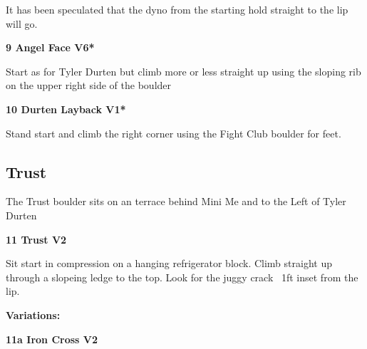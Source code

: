 \begin{multicols}{2}
\begin{adjustwidth}{0.5cm}{}
\begin{minipage}{\linewidth}
							\begin{adjustwidth}{0.5cm}{}				
							It has been speculated that the dyno from the starting hold straight to the lip will go.
							\end{adjustwidth}
							\end{minipage}
						\end{adjustwidth}
					\begin{minipage}{\linewidth}	
					\label{rt:Angel Face}
\colorbox{RoyalBlue!20}{
\parbox{0.95\textwidth}{
\textbf{
9 Angel Face V6*  
}
}
}

					\begin{adjustwidth}{0.5cm}{}				
					Start as for Tyler Durten but climb more or less straight up using the sloping rib on the upper right side of the boulder
					\end{adjustwidth}
					\end{minipage}
					\begin{minipage}{\linewidth}	
					\label{rt:Durten Layback}
\colorbox{green!20}{
\parbox{0.95\textwidth}{
\textbf{
10 Durten Layback V1*  
}
}
}

					\begin{adjustwidth}{0.5cm}{}				
					Stand start and climb the right corner using the Fight Club boulder for feet.
					\end{adjustwidth}
					\end{minipage}
			\begin{minipage}{\columnwidth}
			\subsection*{Trust}\label{bf:Trust}
			The Trust boulder sits on an terrace behind Mini Me and to the Left of Tyler Durten
			
			\end{minipage}
			

					\begin{minipage}{\linewidth}	
					\label{rt:Trust}
\colorbox{green!20}{
\parbox{0.95\textwidth}{
\textbf{
11 Trust V2     
}
}
}

					\begin{adjustwidth}{0.5cm}{}				
					Sit start in compression on a hanging refrigerator block. Climb straight up through a slopeing ledge to the top. Look for the juggy crack ~1ft inset from the lip.
					\end{adjustwidth}
					\end{minipage}
						\begin{adjustwidth}{0.5cm}{}				
						\textbf{Variations:} \newline
							\begin{minipage}{\linewidth}	
							\label{vr:Iron Cross}
\colorbox{green!20}{
\parbox{0.95\textwidth}{
\textbf{
11a Iron Cross V2   
}
}
}


\end{minipage}
\end{adjustwidth}
\end{multicols}
